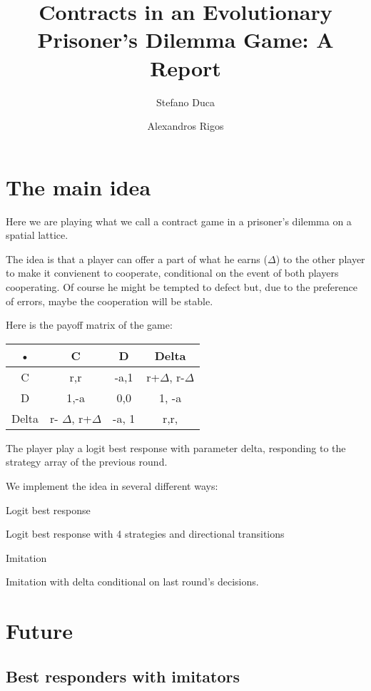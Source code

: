 \documentclass{article}
\author{Stefano Duca \and Alexandros Rigos}
\title{Contracts in an Evolutionary Prisoner's Dilemma Game: A Report}
\begin{document}
\maketitle

\section{The main idea}
Here we are playing what we call a contract game in a prisoner's dilemma on a spatial lattice.

The idea is that a player can offer a part of what he earns ($\Delta$) to the other player to make it convienent to cooperate, conditional on the event of both players cooperating. Of course he might be tempted to defect but, due to the preference of errors, maybe the cooperation will be stable.

Here is the payoff matrix of the game:
\begin{center}
\begin{tabular}{|c|c|c|c|}
\hline 
• & C & D & Delta \\ 
\hline 
C & r,r & -a,1 & r+$\Delta$, r-$\Delta$ \\ 
\hline 
D & 1,-a & 0,0 & 1, -a \\ 
\hline 
Delta & r- $\Delta$, r+$\Delta$ & -a, 1 & r,r, \\ 
\hline 
\end{tabular} 
\end{center}

The player play a logit best response with parameter delta, responding to the strategy array of the previous round.

We implement the idea in several different ways:

Logit best response

Logit best response with 4 strategies and directional transitions 

Imitation

Imitation with delta conditional on last round's decisions.

\section{Future}

\subsection{Best responders with imitators}
\end{document}
